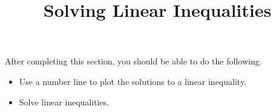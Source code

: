 \documentclass{ximera}
\title{Solving Linear Inequalities}
\begin{document}
\begin{abstract} 
\end{abstract}

\maketitle

\begin{sectionOutcomes}
After completing this section, you should be able to do the following.

\begin{itemize}
	\item Use a number line to plot the solutions to a linear inequality.
    \item Solve linear inequalities.

\end{itemize}
\end{sectionOutcomes}
\end{document}
